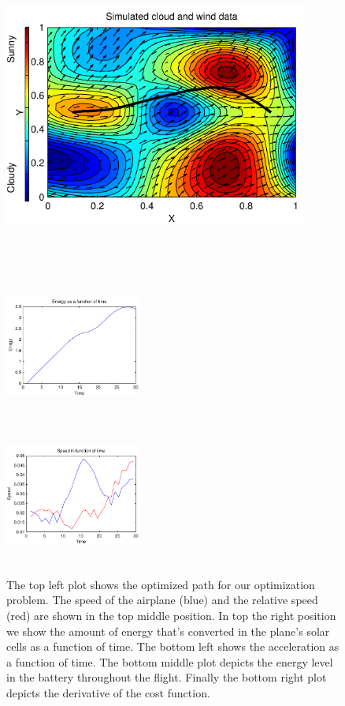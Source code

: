 \begin{figure}[width=15cm]
\begin{minipage}[c][11cm][t]{0.5\textwidth}
  \vspace*{\fill}
  \centering
  \includegraphics[width=10cm,height=10cm]{../src/plot/fancy/path}
  \label{fig:test1}
\end{minipage}%
\begin{minipage}[c][11cm][t]{.5\textwidth}
  \vspace*{\fill}
  \centering
  \includegraphics[width=4.5cm,height=4.5cm]{../src/plot/fancy/Energy}
  \label{fig:test2}\par\vfill
  \includegraphics[width=4.5cm,height=4.5cm]{../src/plot/fancy/speed}
  \label{fig:test3}
\end{minipage}
\caption{The top left plot shows the optimized path for our optimization problem. The speed of the airplane (blue) and the relative speed (red) are shown in the top middle position. In top the right position we show the amount of energy that's converted in the plane's solar cells as a function of time. The bottom left shows the acceleration as a function of time. The bottom middle plot depicts the energy level in the battery throughout the flight. Finally the bottom right plot depicts the derivative of the cost function.}
\label{fig:badPlot}
\end{figure}

